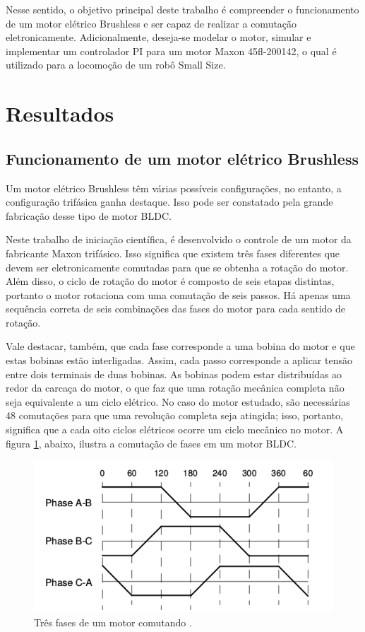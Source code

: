 \documentclass[a4paper,11pt]{article}
\begin{document}
		Nesse sentido, o objetivo principal deste trabalho é compreender o funcionamento de um motor elétrico Brushless e ser capaz de realizar a comutação eletronicamente. Adicionalmente, deseja-se modelar o motor, simular e implementar um controlador PI para um motor Maxon 45fl-200142, o qual é utilizado para a locomoção de um robô Small Size.
	
	\section{Resultados}
		\subsection{Funcionamento de um motor elétrico Brushless}
		
		Um motor elétrico Brushless têm várias possíveis configurações, no entanto, a configuração trifásica ganha destaque. Isso pode ser constatado pela grande fabricação desse tipo de motor BLDC.
		
		Neste trabalho de iniciação científica, é desenvolvido o controle de um motor da fabricante Maxon trifásico. Isso significa que existem três fases diferentes que devem ser eletronicamente comutadas para que se obtenha a rotação do motor. Além disso, o ciclo de rotação do motor é composto de seis etapas distintas, portanto o motor rotaciona com uma comutação de seis passos. Há apenas uma sequência correta de seis combinações das fases do motor para cada sentido de rotação.
		
		Vale destacar, também, que cada fase corresponde a uma bobina do motor e que estas bobinas estão interligadas. Assim, cada passo corresponde a aplicar tensão entre dois terminais de duas bobinas. As bobinas podem estar distribuídas ao redor da carcaça do motor, o que faz que uma rotação mecânica completa não seja equivalente a um ciclo elétrico. No caso do motor estudado, são necessárias 48 comutações para que uma revolução completa seja atingida; isso, portanto, significa que a cada oito ciclos elétricos ocorre um ciclo mecânico no motor. A figura \ref{fig:comutacao}, abaixo, ilustra a comutação de fases em um motor BLDC.
		
		\begin{figure}[ht]
			\centering
			\includegraphics[width=0.7\linewidth]{images/comutacao}
			\caption{Três fases de um motor comutando \cite{introducaobldc}.}
			\label{fig:comutacao}
		\end{figure}
		
\end{document}
